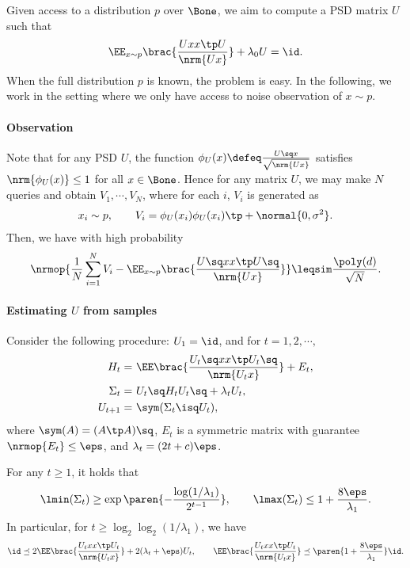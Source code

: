 Given access to a distribution $p$ over $\Bone$, we aim to compute a PSD matrix $U$ such that
\begin{align}
    \EE_{x\sim p}\brac{ \frac{Uxx\tp U}{\nrm{Ux}} }+\lambda_0 U=\id.
\end{align}
When the full distribution $p$ is known, the problem is easy. In the following, we work in the setting where we only have access to noise observation of $x\sim p$. 

\paragraph{Observation}
Note that for any PSD $U$, the function $\phi_U(x)\defeq \frac{U\sq x}{\sqrt{\nrm{Ux}}}$ satisfies $\nrm{\phi_U(x)}\leq 1$ for all $x\in\Bone$. Hence for any matrix $U$, we may make $N$ queries and obtain $V_1,\cdots,V_N$, where for each $i$, $V_i$ is generated as
\begin{align*}
    x_i\sim p, \qquad V_i=\phi_U(x_i)\phi_U(x_i)\tp + \normal{0,\sigma^2}.
\end{align*}
Then, we have with high probability
\begin{align*}
    \nrmop{ \frac{1}{N}\sum_{i=1}^N V_i - \EE_{x\sim p}\brac{ \frac{U\sq xx\tp U\sq}{\nrm{Ux}} } } \leqsim \frac{\poly(d)}{\sqrt{N}}.
\end{align*}

\paragraph{Estimating $U$ from samples}
Consider the following procedure: $U_1=\id$, and for $t=1,2,\cdots,$
\begin{align*}
    H_t=&~\EE\brac{ \frac{U_t\sq xx\tp U_t\sq}{\nrm{U_tx}} }+E_t, \\
    \Sigma_t=&~U_t\sq H_t U_t\sq+\lambda_t U_t, \\
    U_{t+1}=&~\sym(\Sigma_t\isq U_t),
\end{align*}
where $\sym(A)=(A\tp A)\sq$, $E_t$ is a symmetric matrix with guarantee $\nrmop{E_t}\leq \eps$, and $\lambda_t=(2t+c)\eps$.

\begin{proposition}
For any $t\geq 1$, it holds that
\begin{align*}
    \lmin(\Sigma_t) \geq \exp\paren{ -\frac{\log(1/\lambda_1)}{2^{t-1}} }, \qquad \lmax(\Sigma_t)\leq 1+\frac{8\eps}{\lambda_1}.
\end{align*}
In particular, for $t\geq \log_2\log_2(1/\lambda_1)$, we have
\begin{align*}
    \id\preceq 2\EE\brac{ \frac{U_t xx\tp U_t}{\nrm{U_tx}} }+2(\lambda_t+\eps)U_t, \qquad
    \EE\brac{ \frac{U_t xx\tp U_t}{\nrm{U_tx}} }\preceq \paren{1+\frac{8\eps}{\lambda_1}}\id.
\end{align*}
\end{proposition}

